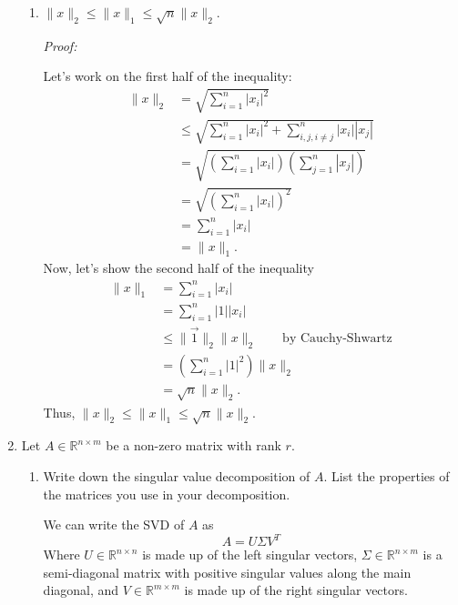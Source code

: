 \documentclass[a4paper,12pt]{article}
\newcommand{\reals}{\mathbb{R}}
\newcommand{\abs}[1]{\left| #1 \right|}
\newcommand{\norm}[1]{\lVert #1 \rVert}
\newenvironment{proof}[2][$\square$]
    {\setlength{\parskip}{0pt}\par\textit{Proof:} #2\setlength{\parskip}{0.25cm}
        \savebox{\qed}{#1}
        \begin{adjustwidth}{\widthof{Proof:}}{}
    }
    {
        \hfill\usebox{\qed}\end{adjustwidth}
    }
\begin{document}
\begin{enumerate}[label = \arabic*.]
\begin{enumerate}[label = (\alph*)]
			\item $ \norm{x}_2 \leq \norm{x}_1 \leq \sqrt{n}\norm{x}_2 $.
				\begin{proof}{}
					Let's work on the first half of the inequality:
					\begin{align*}
						\norm{x}_2 &= \sqrt{\sum_{i = 1}^{n} \abs{x_i}^2} \\
						&\leq \sqrt{\sum_{i = 1}^{n} \abs{x_i}^2 + \sum_{i,j, i \neq j}^{n}\abs{x_i}\abs{x_j}} \\
						&= \sqrt{\left(\sum_{i = 1}^{n} \abs{x_i}\right)\left(\sum_{j = 1}^{n} \abs{x_j}\right)} \\
						&= \sqrt{\left(\sum_{i = 1}^{n} \abs{x_i}\right)^2} \\
						&= \sum_{i = 1}^{n} \abs{x_i} \\
						&= \norm{x}_1.
					\end{align*}
					Now, let's show the second half of the inequality
					\begin{align*}
						\norm{x}_1 &= \sum_{i = 1}^{n} \abs{x_i} \\
						&= \sum_{i = 1}^{n} \abs{1} \abs{x_i} \\
						&\leq \norm{\vec{1}}_2 \norm{x}_2 \qquad \text{by Cauchy-Shwartz} \\
						&= \left(\sum_{i = 1}^{n} \abs{1}^2\right) \norm{x}_2 \\
						&= \sqrt{n} \norm{x}_2.
						\end{align*}
						Thus, $ \norm{x}_2 \leq \norm{x}_1 \leq \sqrt{n}\norm{x}_2 $.
				\end{proof}
		\end{enumerate}
	
		\item Let $ A \in \reals^{n \times m} $ be a non-zero matrix with rank $ r $.
			\begin{enumerate}[label = (\alph*)]
				\item Write down the singular value decomposition of $ A $. List the properties of the matrices you use in your decomposition.
					
				We can write the SVD of $ A $ as 
				\[
					A = U \Sigma V^T
				\]
				Where $ U \in \reals^{n \times n} $ is made up of the left singular vectors, $ \Sigma \in \reals^{n \times m} $ is a semi-diagonal matrix with positive singular values along the main diagonal, and $ V \in \reals^{m \times m} $ is made up of the right singular vectors. 
				

\end{enumerate}
\end{enumerate}
\end{document}
